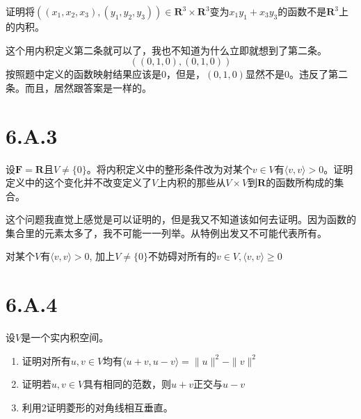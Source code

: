 \documentclass[10pt,a4paper,UTF8]{article}
\begin{document}
\begin{tikzproblem}
证明将\(((x_{1},x_{2},x_{3}),(y_{1},y_{2},y_{3}))\in \mathbf{R}^{3}\times \mathbf{R}^{3}\)变为\(x_{1}y_{1} + x_{3}y_{3}\)的函数不是\(\mathbf{R}^{3}\)上的内积。
\end{tikzproblem}

\begin{tikzanswer}
这个用内积定义第二条就可以了，我也不知道为什么立即就想到了第二条。
\begin{equation}
\label{eq:4}
((0,1,0),(0,1,0))
\end{equation}
按照题中定义的函数映射结果应该是\(0\)，但是，\((0,1,0)\)显然不是\(0\)。违反了第二条。而且，居然跟答案是一样的。
\end{tikzanswer}
\section{6.A.3}
\label{sec:org9c52f03}


\begin{tikzproblem}
设\(\mathbf{F} = \mathbf{R}\)且\(V\neq \{0\}\)。将内积定义中的整形条件改为对某个\(v\in V\)有\(\langle v,v \rangle > 0\)。证明定义中的这个变化并不改变定义了\(V\)上内积的那些从\(V\times V\)到\(\mathbf{R}\)的函数所构成的集合。
\end{tikzproblem}

\begin{tikzanswer}
这个问题我直觉上感觉是可以证明的，但是我又不知道该如何去证明。因为函数的集合里的元素太多了，我不可能一一列举。从特例出发又不可能代表所有。

对某个\(V\)有\(\langle v,v \rangle > 0\), 加上\(V\neq \{0\}\)不妨碍对所有的\(v\in V, \langle v,v \rangle \geq 0\)
\end{tikzanswer}
\section{6.A.4}
\label{sec:org8497da3}


\begin{tikzproblem}
设\(V\)是一个实内积空间。
\begin{enumerate}
\item 证明对所有\(u,v\in V\)均有\(\langle u+v,u-v \rangle   = \| u \|^{2} - \| v \|^{2}\)
\item 证明若\(u,v\in V\)具有相同的范数，则\(u+v\)正交与\(u-v\)
\item 利用\(2\)证明菱形的对角线相互垂直。
\end{enumerate}
\end{tikzproblem}
\end{document}

